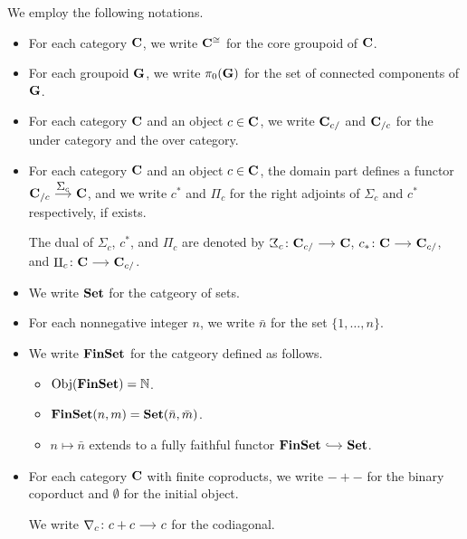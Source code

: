 \documentclass[a4paper,dvipsnames, 11pt]{amsart} %
\begin{document}
\maketitle
\cite{FS19}
\begin{notation}
	We employ the following notations. 
	\begin{itemize}
		\item %
			For each category $\mathbf{C}$,
			we write ${\mathbf{C}}^{\cong}$ for the core groupoid of $\mathbf{C}$.
		\item %
			For each groupoid $\mathbf{G}$, we write $\pi_0(\mathbf{G})$ for the set of connected components of $\mathbf{G}$.
		\item %
			For each category $\mathbf{C}$ and an object $c\in\mathbf{C}$,
			we write $\mathbf{C}_{c/}$ and $\mathbf{C}_{/c}$ for the under category and the over category.
		\item %
			For each category $\mathbf{C}$ and an object $c\in\mathbf{C}$,
			the domain part defines a functor $\one{C}_{/c}\arr"\Sigma_c"\one{C}$,
			and we write $c^*$ and $\Pi_c$ for the right adjoints of $\Sigma_c$ and $c^*$ respectively,
			if exists.

			The dual of $\Sigma_c$, $c^*$, and $\Pi_c$ are
			denoted by $\arbSigma_c\colon\one{C}_{c/}\arr\one{C}$, $c_*\colon\one{C}\arr\one{C}_{c/}$, and $\arbPi_c\colon\one{C}\arr\one{C}_{c/}$.
		\item %
			We write $\mathbf{Set}$ for the catgeory of sets.
		\item %
			For each nonnegative integer $n$,
			we write $\bar{n}$ for the set $\{1,\ldots,n\}$.
		\item %
			We write $\mathbf{FinSet}$ for the catgeory defined as follows.
			\begin{itemize}
				\item %
					$\operatorname{\mathrm{Obj}}(\mathbf{FinSet})=\mathbb{N}$.
				\item %
					$\mathbf{FinSet}(n,m)=\mathbf{Set}(\bar{n},\bar{m})$.
				\item %
					$n\mapsto\bar{n}$ extends to a fully faithful functor $\FinSet\arr[hook]\Set$.
			\end{itemize}
		\item %
			For each category $\mathbf{C}$ with finite coproducts,
			we write $-+-$ for the binary coporduct and $\emptyset$ for the initial object.

			We write ${\Atled}_c\colon c+c\arr c$ for the codiagonal.
	\end{itemize}
\end{notation}
\end{document}

